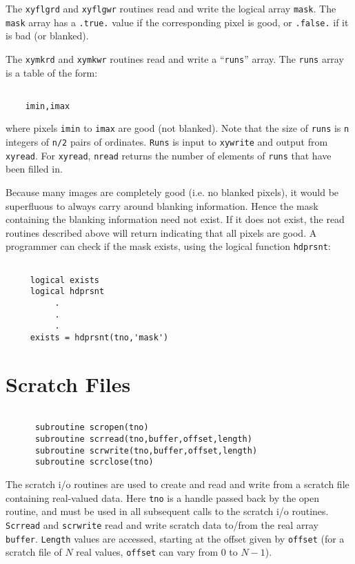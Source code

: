 The {\tt xyflgrd} and {\tt xyflgwr} routines read and write the logical
array {\tt mask}. The {\tt mask} array has a {\tt .true.} value if the
corresponding pixel is good, or {\tt .false.} if it is bad (or blanked).

The {\tt xymkrd} and {\tt xymkwr} routines read and write a ``{\tt runs}''
array. The {\tt runs} array is a table of the form:
\begin{verbatim}

    imin,imax

\end{verbatim}
where pixels {\tt imin} to {\tt imax} are good (not blanked). Note that
the size of {\tt runs} is {\tt n} integers of {\tt n/2} pairs of
ordinates. {\tt Runs} is input to
{\tt xywrite} and output from {\tt xyread}. For {\tt xyread}, {\tt nread}
returns the number of elements of {\tt runs} that have been filled in.

Because many images are completely good (i.e. no blanked pixels),
it would be superfluous to always carry around blanking information.
Hence the
mask containing the blanking information need not exist. If it does not
exist, the read routines described above will return indicating that all
pixels are good.
A programmer can check if the mask exists, using the logical function
{\tt hdprsnt}:
\begin{verbatim}

     logical exists
     logical hdprsnt
          .
          .
          .
     exists = hdprsnt(tno,'mask')

\end{verbatim}

\section{Scratch Files}
\begin{verbatim}

      subroutine scropen(tno)
      subroutine scrread(tno,buffer,offset,length)
      subroutine scrwrite(tno,buffer,offset,length)
      subroutine scrclose(tno)

\end{verbatim}
The scratch i/o routines are used to create and read and write from a
scratch file containing real-valued data. Here {\tt tno} is a handle passed
back by the open routine,
and must be used in all subsequent calls to the scratch i/o routines.
{\tt Scrread} and {\tt scrwrite} read and write scratch data to/from the
real array {\tt buffer}. {\tt Length} values are accessed, starting
at the offset given by {\tt offset} (for a scratch file of $N$ real
values, {\tt offset} can vary from 0 to $N-1$).

